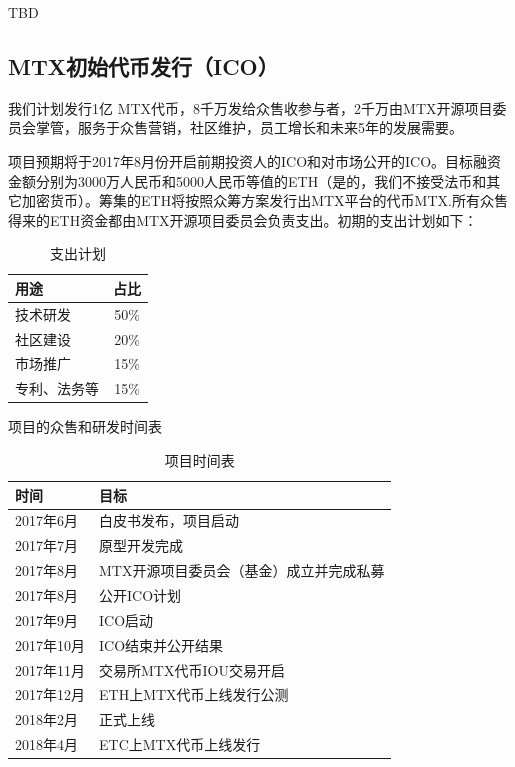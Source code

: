 \documentclass[UTF8,nofonts]{ctexart}
\begin{document}
TBD

\newpage



\newpage
\begin{appendices}
\section{MTX初始代币发行（ICO）\label{sec:ico}}

我们计划发行1亿 MTX代币，8千万发给众售收参与者，2千万由MTX开源项目委员会掌管，服务于众售营销，社区维护，员工增长和未来5年的发展需要。

项目预期将于2017年8月份开启前期投资人的ICO和对市场公开的ICO。目标融资金额分别为3000万人民币和5000人民币等值的ETH（是的，我们不接受法币和其它加密货币）。筹集的ETH将按照众筹方案发行出MTX平台的代币MTX.所有众售得来的ETH资金都由MTX开源项目委员会负责支出。初期的支出计划如下：

\begin{table}[hbt]
  \centering
  \begin{tabular}{l|c}
 用途   & 占比\\
    \hline
  技术研发 & 50\% \\
  社区建设 & 20\% \\
  市场推广 & 15\% \\
  专利、法务等 & 15\% \\
  \end{tabular}
  \caption{支出计划}
\end{table}


项目的众售和研发时间表
\begin{table}[hbt]
  \centering
  \begin{tabular}{l|l}
 时间   & 目标\\
    \hline
  2017年6月 & 白皮书发布，项目启动 \\
  2017年7月 & 原型开发完成 \\
  2017年8月 & MTX开源项目委员会（基金）成立并完成私募 \\
  2017年8月 & 公开ICO计划 \\
  2017年9月 & ICO启动 \\
  2017年10月 & ICO结束并公开结果 \\
  2017年11月 & 交易所MTX代币IOU交易开启 \\
  2017年12月 & ETH上MTX代币上线发行公测 \\
  2018年2月 & 正式上线 \\
  2018年4月 & ETC上MTX代币上线发行 \\
  \end{tabular}
  \caption{项目时间表}
\end{table}


\end{appendices}
\end{document}
